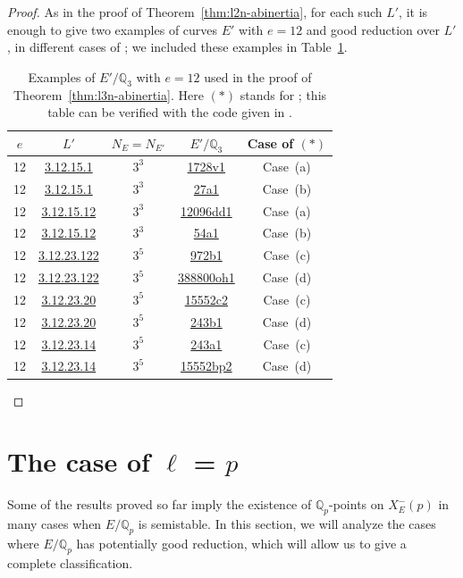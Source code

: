 \documentclass[12pt]{amsart}
\numberwithin{equation}{section}
\theoremstyle{definition}
\newcommand{\Q}{\mathbb{Q}}
\newcommand{\Xp}{X_E^{-}(p)}
\newcommand{\LMFDBE}[1]{\href{https://www.lmfdb.org/EllipticCurve/Q/#1}{\textsf{#1}}}
\newcommand{\LMFDBL}[1]{\href{https://www.lmfdb.org/padicField/#1}{\textsf{#1}}}
\begin{document}
\begin{proof}
As in the proof of Theorem~\ref{thm:l2n-abinertia}, for each such $L'$, it is enough to give two examples of curves $E'$ with $e=12$ and good reduction over $L'$, in different cases of \cite[Table 4]{symplectic}; we included these examples in Table~\ref{tab:l3examples}.
\begin{table}[h]
    \centering
    \begin{tabular}{|c||c|c|c|c|}
        \hline
        $e$ & $L'$ & $N_E = N_{E'}$ & $E'/\Q_3$ & Case of $(*)$
        \\ \hline
        12& \LMFDBL{3.12.15.1} &$3^3$ & \LMFDBE{1728v1} & Case~(a) \\ \hline
       12& \LMFDBL{3.12.15.1} &$3^3$ & \LMFDBE{27a1} & Case~(b) \\ \hline
    12& \LMFDBL{3.12.15.12} &$3^3$ & \LMFDBE{12096dd1} & Case~(a) \\ \hline
    12& \LMFDBL{3.12.15.12} &$3^3$ & \LMFDBE{54a1} & Case~(b) \\ \hline
 12& \LMFDBL{3.12.23.122} &$3^5$ & \LMFDBE{972b1} & Case~(c)  \\ \hline
 12& \LMFDBL{3.12.23.122} &$3^5$ & \LMFDBE{388800oh1} & Case~(d)  \\ \hline
12& \LMFDBL{3.12.23.20} &$3^5$ & \LMFDBE{15552c2} & Case~(c)  \\ \hline
    12& \LMFDBL{3.12.23.20} &$3^5$ & \LMFDBE{243b1} & Case~(d)  \\ \hline
12& \LMFDBL{3.12.23.14} &$3^5$ & \LMFDBE{243a1} & Case~(c)  \\ \hline
    12& \LMFDBL{3.12.23.14} &$3^5$ & \LMFDBE{15552bp2} & Case~(d)  \\ \hline
    \end{tabular}
    \caption{Examples of $E'/\Q_3$ with $e=12$ used in the proof of Theorem~\ref{thm:l3n-abinertia}. Here $(*)$ stands for \cite[Table 4]{symplectic}; this table can be verified with the code given in \cite[Table 5]{git}.}
    \label{tab:l3examples}
\end{table}
\end{proof}
\newpage
\section{The case of \texorpdfstring{$\ell$}{l} = \texorpdfstring{$p$}{p}}

Some of the results proved so far imply the existence of $\Q_p$-points on $\Xp$ in many cases when $E/\Q_p$ is semistable. In this section, we will analyze the cases where $E/\Q_p$ has potentially good reduction, which will allow us to give a complete classification. 
\end{document}
